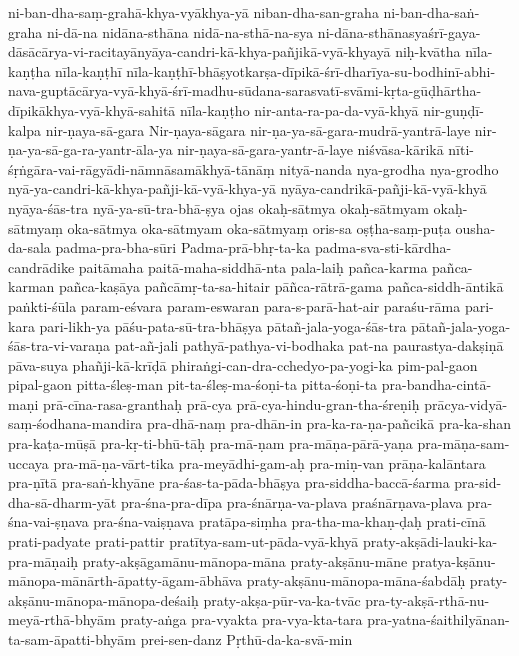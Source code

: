 {ni-ban-dha-saṃ-grahā-khya-vyākhya-yā
niban-dha-san-graha
ni-ban-dha-saṅ-graha
ni-dā-na
    nidāna-sthāna
nidā-na-sthā-na-sya
ni-dāna-sthānasyaśrī-gaya-dāsācārya-vi-racitayānyāya-candri-kā-khya-pañjikā-vyā-khyayā
    niḥ-kvātha
nīla-kaṇṭha
    nīla-kaṇṭhī 
 nīla-kaṇṭhī-bhāṣyotkarṣa-dīpikā-śrī-dharīya-su-bodhinī-abhi-nava-guptācārya-vyā-khyā-śrī-madhu-sūdana-sarasvatī-svāmi-kṛta-gūḍhārtha-dīpikākhya-vyā-khyā-sahitā
    nīla-kaṇṭho
nir-anta-ra-pa-da-vyā-khyā
nir-guṇḍī-kalpa
nir-ṇaya-sā-gara
Nir-ṇaya-sāgara
nir-ṇa-ya-sā-gara-mudrā-yantrā-laye
nir-ṇa-ya-sā-ga-ra-yantr-āla-ya
nir-ṇaya-sā-gara-yantr-ā-laye
niśvāsa-kārikā
nīti-śṛṅgāra-vai-rāgyādi-nāmnāsamākhyā-tānāṃ
nityā-nanda
nya-grodha
nya-grodho
nyā-ya-candri-kā-khya-pañji-kā-vyā-khya-yā
nyāya-candrikā-pañji-kā-vyā-khyā
nyāya-śās-tra
    nyā-ya-sū-tra-bhā-ṣya
ojas
okaḥ-sātmya
okaḥ-sātmyam
okaḥ-sātmyaṃ
oka-sātmya
oka-sātmyam
oka-sātmyaṃ
oris-sa
oṣṭha-saṃ-puṭa
ousha-da-sala
padma-pra-bha-sūri
Padma-prā-bhṛ-ta-ka
padma-sva-sti-kārdha-candrādike
paitāmaha
paitā-maha-siddhā-nta
    pala-laiḥ 
pañca-karma
pañca-karman
pañca-kaṣāya
    pañcāmṛ-ta-sa-hitair
pāñca-rātrā-gama
pañca-siddh-āntikā
paṅkti-śūla
param-eśvara
param-eswaran
    para-s-parā-hat-air
paraśu-rāma
pari-kara
pari-likh-ya
pāśu-pata-sū-tra-bhāṣya
pātañ-jala-yoga-śās-tra
pātañ-jala-yoga-śās-tra-vi-varaṇa
pat-añ-jali
    pathyā-pathya-vi-bodhaka
pat-na
paurastya-dakṣiṇā
pāva-suya
phañji-kā-krīḍā
phiraṅgi-can-dra-cchedyo-pa-yogi-ka
pim-pal-gaon
pipal-gaon
pitta-śleṣ-man
pit-ta-śleṣ-ma-śoṇi-ta
pitta-śoṇi-ta
pra-bandha-cintā-maṇi
prā-cīna-rasa-granthaḥ
prā-cya
prā-cya-hindu-gran-tha-śreṇiḥ
prācya-vidyā-saṃ-śodhana-mandira
    pra-dhā-naṃ
pra-dhān-in
    pra-ka-ra-ṇa-pañcikā
pra-ka-shan
pra-kaṭa-mūṣā
pra-kṛ-ti-bhū-tāḥ
    pra-mā-ṇam
    pra-māṇa-pārā-yaṇa
    pra-māṇa-sam-uccaya
pra-mā-ṇa-vārt-tika
    pra-meyādhi-gam-aḥ
    pra-miṇ-van
prāṇa-kalāntara
pra-ṇītā
pra-saṅ-khyāne
pra-śas-ta-pāda-bhāṣya
    pra-siddha-baccā-śarma 
    pra-sid-dha-sā-dharm-yāt
pra-śna-pra-dīpa
pra-śnārṇa-va-plava
praśnārṇava-plava
pra-śna-vai-ṣṇava
pra-śna-vaiṣṇava
pratāpa-siṃha
    pra-tha-ma-khaṇ-ḍaḥ
prati-cīnā
prati-padyate
    prati-pattir
    pratītya-sam-ut-pāda-vyā-khyā
    praty-akṣādi-lauki-ka-pra-māṇaiḥ
    praty-akṣāgamānu-mānopa-māna
    praty-akṣānu-māne
    pratya-kṣānu-mānopa-mānārth-āpatty-āgam-ābhāva
    praty-akṣānu-mānopa-māna-śabdāḥ
    praty-akṣānu-mānopa-mānopa-deśaiḥ
    praty-akṣa-pūr-va-ka-tvāc 
    pra-ty-akṣā-rthā-nu-meyā-rthā-bhyām
    praty-aṅga
    pra-vyakta
     pra-vya-kta-tara
pra-yatna-śaithilyānan-ta-sam-āpatti-bhyām
prei-sen-danz
Pṛthū-da-ka-svā-min
}
